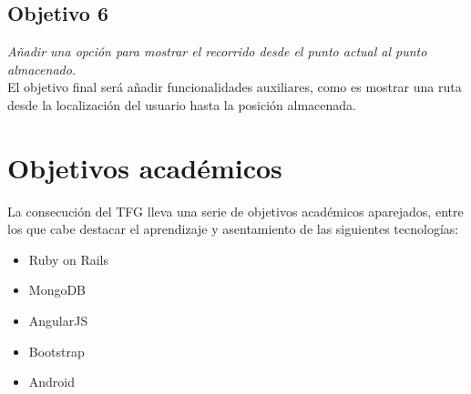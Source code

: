 \subsection{Objetivo 6}
\emph{Añadir una opción para mostrar el recorrido desde el punto actual al punto almacenado.}\\
El objetivo final será añadir funcionalidades auxiliares, como es mostrar una ruta desde la localización del usuario hasta la posición almacenada.

\section{Objetivos académicos}
La consecución del \ac{TFG} lleva una serie de objetivos académicos aparejados, entre los que cabe destacar el aprendizaje y asentamiento de las siguientes tecnologías:

\begin{itemize}[label={$\bullet$},labelindent=\parindent,leftmargin=2cm]
	\item Ruby on Rails
	\item MongoDB
	\item AngularJS
	\item Bootstrap
	\item Android
\end{itemize}

